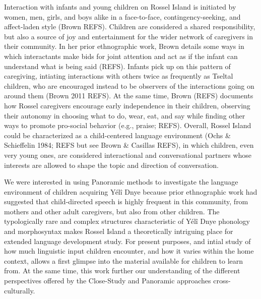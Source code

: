 \documentclass[,man,floatsintext]{apa6}
\begin{document}
Interaction with infants and young children on Rossel Island is
initiated by women, men, girls, and boys alike in a face-to-face,
contingency-seeking, and affect-laden style (Brown REFS). Children are
considered a shared responsibility, but also a source of joy and
entertainment for the wider network of caregivers in their community. In
her prior ethnographic work, Brown details some ways in which
interactants make bids for joint attention and act as if the infant can
understand what is being said (REFS). Infants pick up on this pattern of
caregiving, intiating interactions with others twice as frequently as
Tseltal children, who are encouraged instead to be observers of the
interactions going on around them (Brown 2011 REFS). At the same time,
Brown (REFS) documents how Rossel caregivers encourage early
independence in their children, observing their autonomy in choosing
what to do, wear, eat, and say while finding other ways to promote
pro-social behavior (e.g., praise; REFS). Overall, Rossel Island could
be characterized as a child-centered language environment (Ochs \&
Schieffelin 1984; REFS but see Brown \& Casillas REFS), in which
children, even very young ones, are considered interactional and
conversational partners whose interests are allowed to shape the topic
and direction of conversation.

We were interested in using Panoramic methods to investigate the
language environment of children acquiring Yélî Dnye because prior
ethnographic work had suggested that child-directed speech is highly
frequent in this community, from mothers and other adult caregivers, but
also from other children. The typologically rare and complex structures
characteristic of Yélî Dnye phonology and morphosyntax makes Rossel
Island a theoretically intriguing place for extended language
development study. For present purposes, and intial study of how much
linguistic input children encounter, and how it varies within the home
context, allows a first glimpse into the material available for children
to learn from. At the same time, this work further our understanding of
the different perspectives offered by the Close-Study and Panoramic
approaches cross-culturally.
\end{document}
